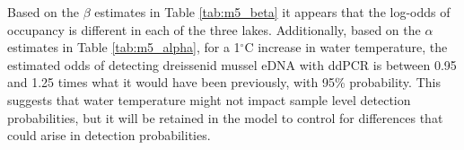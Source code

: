 \documentclass[12pt]{article}\usepackage[]{graphicx}\usepackage[]{color}
\begin{document}
\begin{table}[!h]
\caption{\label{tab:m5_beta}
             Summary table of the $\hat \beta$ coefficients for $logit(\hat \psi_i) = \hat \beta_0 + 
             \hat \beta_1I_{lake = LG, i} + \hat \beta_2I_{lake = MG, i}$.}
\small
{}
\end{table}

Based on the $\beta$ estimates in Table \ref{tab:m5_beta} it appears that the log-odds of occupancy is different in each of the three lakes. Additionally, based on the $\alpha$ estimates in Table \ref{tab:m5_alpha}, for a 1$^\circ$C increase in water temperature, the estimated odds of detecting dreissenid mussel eDNA with ddPCR is between 0.95 and 1.25 times what it would have been previously, with 95\% probability. This suggests that water temperature might not impact sample level detection probabilities, but it will be retained in the model to control for differences that could arise in detection probabilities.  



\begin{table}[!h]
\caption{\label{tab:m5_alpha}
             Summary table of the $\hat \alpha$ coefficients for $logit(\hat p_{ij}) = \hat \alpha_0 +
             \hat \alpha_1water.temp_{ij}$.}
\small
{}
\end{table}
\end{document}
